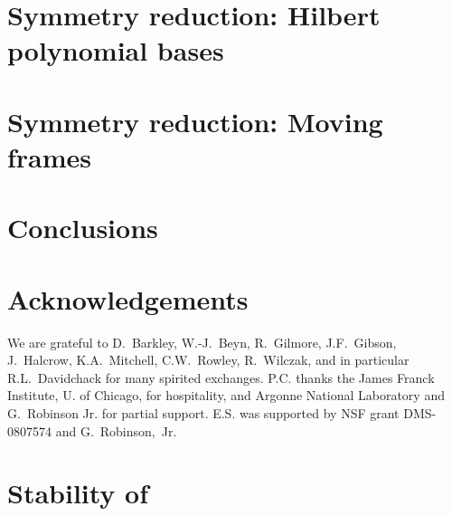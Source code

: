 \documentclass[preprint,number,sort&compress]{elsarticle}
\begin{document}
   
   

\section{\label{s:Hilbert} Symmetry reduction: Hilbert polynomial bases}
    
    

\section{\label{sec:mf} Symmetry reduction: Moving frames}
    
    
    
    


\section{Conclusions}
    

\section*{Acknowledgements}
We are grateful to
D.~Barkley,
W.-J.~Beyn,
R.~Gilmore,
J.F.~Gibson,
J.~Halcrow,
K.A.~Mitchell,
C.W.~Rowley,
R.~Wilczak,
and in particular R.L.~Davidchack for many spirited exchanges.
P.C. thanks the
James Franck Institute, U. of Chicago,
for hospitality, and Argonne National Laboratory and
G.~Robinson Jr. for partial support.
E.S. was supported by NSF grant DMS-0807574 and G.~Robinson,~Jr.

\appendix

\section{\label{s:StabReq} Stability of \reqva}
    

% 



    \newpage
    
    
\end{document}
